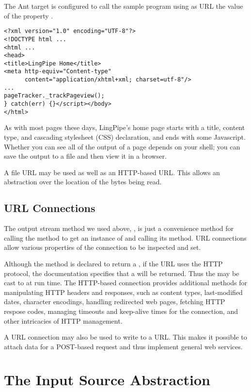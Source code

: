The Ant target  is configured to call the sample
program using as URL the value of the property .
%
\begin{verbatim}
<?xml version="1.0" encoding="UTF-8"?>
<!DOCTYPE html ...
<html ...
<head>
<title>LingPipe Home</title>
<meta http-equiv="Content-type"
      content="application/xhtml+xml; charset=utf-8"/>
...
pageTracker._trackPageview();
} catch(err) {}</script></body>
</html>
\end{verbatim}
%
As with most pages these days, LingPipe's home page starts with
a title, content type, and cascading stylesheet (CSS) declaration,
and ends with some Javascript.  
Whether you can see all of the output of a page depends on your
shell; you can save the output to a file and then view it in a
browser.  

A file URL may be used as well as an HTTP-based URL.  This allows an
abstraction over the location of the bytes being read.  


\subsection{URL Connections}

The output stream method we used above, , is
just a convenience method for calling the 
method to get an instance of  and calling its
 method.  URL connections allow various
properties of the connection to be inspected and set.  

Although the  method  is declared to
return a , if the URL uses the HTTP protocol, the
documentation specifies that a  will be
returned.  Thus the  may be cast to
 at run time.  The HTTP-based connection
provides additional methods for manipulating HTTP headers and
responses, such as content types, last-modified dates, character
encodings, handling redirected web pages, fetching HTTP respose codes,
managing timeouts and keep-alive times for the connection, and other
intricacies of HTTP management.

A URL connection may also be used to write to a URL.  This makes it
possible to attach data for a POST-based request and thus implement
general web services.


\section{The Input Source Abstraction}

